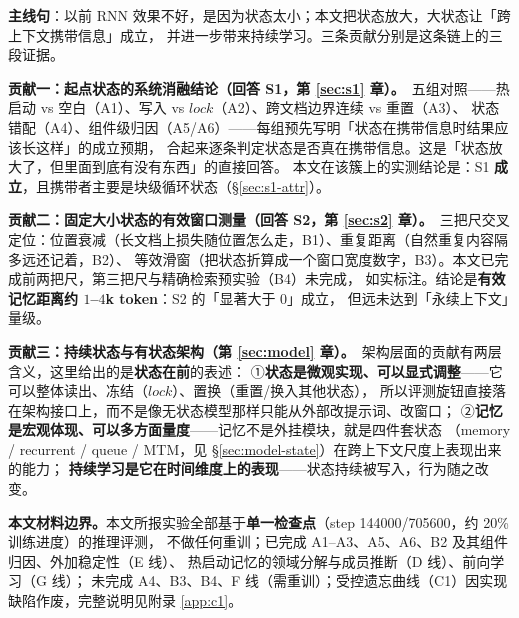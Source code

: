 \textbf{主线句}：以前 RNN 效果不好，是因为状态太小；本文把状态放大，大状态让「跨上下文携带信息」成立，
并进一步带来持续学习。三条贡献分别是这条链上的三段证据。

\textbf{贡献一：起点状态的系统消融结论（回答 S1，第 \ref{sec:s1} 章）。}\
五组对照——热启动 vs 空白（A1）、写入 vs $\mathit{lock}$（A2）、跨文档边界连续 vs 重置（A3）、
状态错配（A4）、组件级归因（A5/A6）——每组预先写明「状态在携带信息时结果应该长这样」的成立预期，
合起来逐条判定状态是否真在携带信息。这是「状态放大了，但里面到底有没有东西」的直接回答。
本文在该簇上的实测结论是：S1 \textbf{成立}，且携带者主要是块级循环状态（\S\ref{sec:s1-attr}）。

\textbf{贡献二：固定大小状态的有效窗口测量（回答 S2，第 \ref{sec:s2} 章）。}\
三把尺交叉定位：位置衰减（长文档上损失随位置怎么走，B1）、重复距离（自然重复内容隔多远还记着，B2）、
等效滑窗（把状态折算成一个窗口宽度数字，B3）。本文已完成前两把尺，第三把尺与精确检索预实验（B4）未完成，
如实标注。结论是\textbf{有效记忆距离约 $1$–$4$k token}：S2 的「显著大于 0」成立，
但远未达到「永续上下文」量级。

\textbf{贡献三：持续状态与有状态架构（第 \ref{sec:model} 章）。}\
架构层面的贡献有两层含义，这里给出的是\textbf{状态在前}的表述：
①\textbf{状态是微观实现、可以显式调整}——它可以整体读出、冻结（$\mathit{lock}$）、置换（重置/换入其他状态），
所以评测旋钮直接落在架构接口上，而不是像无状态模型那样只能从外部改提示词、改窗口；
②\textbf{记忆是宏观体现、可以多方面量度}——记忆不是外挂模块，就是四件套状态
（memory / recurrent / queue / MTM，见 \S\ref{sec:model-state}）在跨上下文尺度上表现出来的能力；
\textbf{持续学习是它在时间维度上的表现}——状态持续被写入，行为随之改变。


\textbf{本文材料边界。}本文所报实验全部基于\textbf{单一检查点}（step 144000/705600，约 20\% 训练进度）的推理评测，
不做任何重训；已完成 A1–A3、A5、A6、B2 及其组件归因、外加稳定性（E 线）、
热启动记忆的领域分解与成员推断（D 线）、前向学习（G 线）；
未完成 A4、B3、B4、F 线（需重训）；受控遗忘曲线（C1）因实现缺陷作废，完整说明见附录 \ref{app:c1}。
